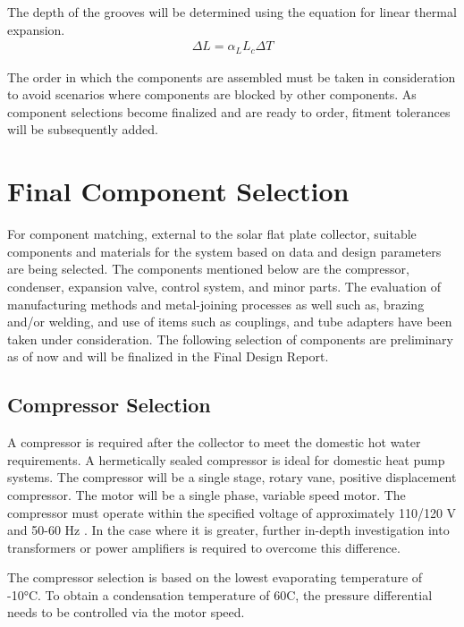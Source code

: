 \medskip
The depth of the grooves will be determined using the equation for linear thermal expansion.
\begin{align}
    \Delta L = \alpha_L L_c \Delta T
\end{align}

\medskip
The order in which the components are assembled must be taken in consideration to avoid scenarios where components are blocked by other components. As component selections become finalized and are ready to order, fitment tolerances will be subsequently added.

\newpage
\section{Final Component Selection}

For component matching, external to the solar flat plate collector, suitable components and materials for the system based on data and design parameters are being selected. The components mentioned below are the compressor, condenser, expansion valve, control system, and minor parts. The evaluation of manufacturing methods and metal-joining processes as well such as, brazing and/or welding, and use of items such as couplings, and tube adapters have been taken under consideration. The following selection of components are preliminary as of now and will be finalized in the Final Design Report.

\subsection{Compressor Selection}

A compressor is required after the collector to meet the domestic hot water requirements. A hermetically sealed compressor is ideal for domestic heat pump systems. The compressor will be a single stage, rotary vane, positive displacement compressor. The motor will be a single phase, variable speed motor. The compressor must operate within the specified voltage of approximately 110/120 V and 50-60 Hz \cite{power_plugs}. In the case where it is greater, further in-depth investigation into transformers \cite{canada_voltage} \cite{valve_selection} or power amplifiers is required to overcome this difference.

\medskip
The compressor selection is based on the lowest evaporating temperature of -10°C. To obtain a condensation temperature of 60\textdegree C, the pressure differential needs to be controlled via the motor speed.

